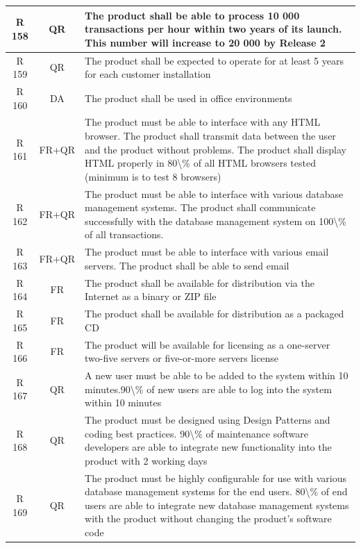 \documentclass[dissertation,final]{softeng}
\begin{document}
\begin{appendices}
{\begin{center}
\begin{longtable}{c c m{}}
    R 158   & QR & The product shall be able to process 10 000 transactions per hour within two years of its launch. This number will increase to 20 000 by Release 2 \\    \midrule
    R 159   & QR & The product shall be expected to operate for at least 5 years for each customer installation \\    \midrule
    R 160   & DA & The product shall be used in office environments \\    \midrule
    R 161   & FR+QR & The product must be able to interface with any HTML browser. The product shall transmit data between the user and the product without problems. The product shall display HTML properly in 80\textbackslash{}\% of all HTML browsers tested (minimum is to test 8 browsers) \\    \midrule
    R 162   & FR+QR & The product must be able to interface with various database management systems. The product shall communicate successfully with the database management system on 100\textbackslash{}\% of all transactions. \\    \midrule
    R 163   & FR+QR & The product must be able to interface with various email servers. The product shall be able to send email \\    \midrule
    R 164   & FR & The product shall be available for distribution via the Internet as a binary or ZIP file \\    \midrule
    R 165   & FR & The product shall be available for distribution as a packaged CD \\    \midrule
    R 166   & FR & The product will be available for licensing as a one-server two-five servers or five-or-more servers license \\    \midrule
    R 167   & QR & A new user must be able to be added to the system within 10 minutes.90\textbackslash{}\% of new users are able to log into the system within 10 minutes \\    \midrule
    R 168   & QR & The product must be designed using Design Patterns and coding best practices. 90\textbackslash{}\% of maintenance software developers are able to integrate new functionality into the product with 2 working days \\    \midrule
    R 169   & QR & The product must be highly configurable for use with various database management systems for the end users. 80\textbackslash{}\% of end users are able to integrate new database management systems with the product without changing the product's software code \\    \midrule

\end{longtable}
\end{center}}
\end{appendices}
\end{document}
